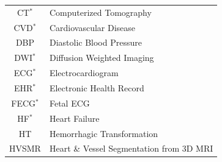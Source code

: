 \documentclass[journal]{IEEEtran}
\begin{document}
\begin{table}[!t]
\begin{minipage}{0.5\textwidth}
\begin{tabularx}{\textwidth}{c l}
			CT$^*$                                                                                                                                                           & Computerized Tomography                                    \\
			CVD$^*$                                                                                                                                                          & Cardiovascular Disease                                     \\
			DBP                                                                                                                                                              & Diastolic Blood Pressure                                   \\
			DWI$^*$                                                                                                                                                          & Diffusion Weighted Imaging                                 \\
			ECG$^*$                                                                                                                                                          & Electrocardiogram                                          \\
			EHR$^*$                                                                                                                                                          & Electronic Health Record                                   \\
			FECG$^*$                                                                                                                                                         & Fetal ECG                                                  \\
			HF$^*$                                                                                                                                                           & Heart Failure                                              \\
			HT                                                                                                                                                               & Hemorrhagic Transformation                                 \\
			HVSMR                                                                                                                                                            & Heart \& Vessel Segmentation from 3D MRI                   \\

\end{tabularx}
\end{minipage}
\end{table}
\end{document}
